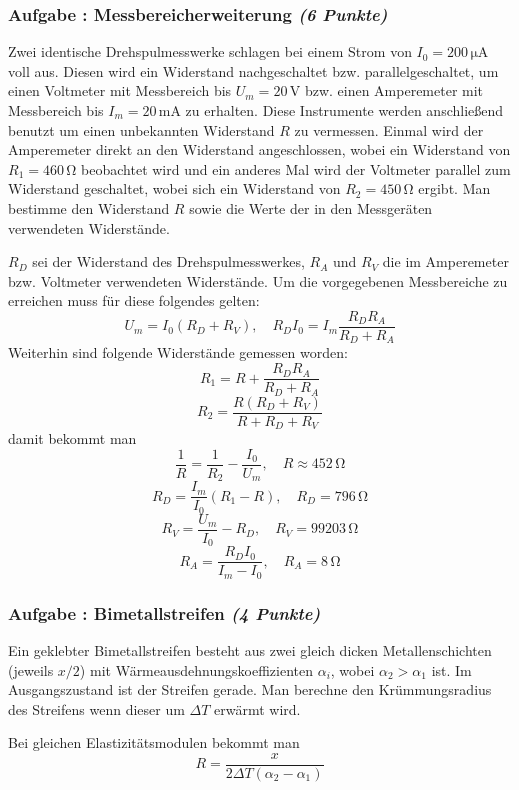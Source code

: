 \documentclass[12pt,a4paper]{article}
\newcommand{\unit}[1]{\,\mathrm{#1}}
\newcounter{numlabel}
\newenvironment{problem}[2]{\stepcounter{numlabel} \vspace{1ex} \subsubsection*{Aufgabe \the\value{numlabel}: #1 \emph{(#2 Punkte)}} \renewcommand{\Currentlabel}{Aufgabe \the\value{numlabel}: #1}}{

}
\begin{document}
\begin{problem}{Messbereicherweiterung}{6}
Zwei identische Drehspulmesswerke schlagen bei einem Strom von $I_0 = 200 \unit{\mu A}$ voll aus. Diesen wird ein Widerstand nachgeschaltet bzw. parallelgeschaltet, um einen Voltmeter mit Messbereich bis $U_m = 20 \unit{V}$ bzw. einen Amperemeter mit Messbereich bis $I_m = 20 \unit{mA}$ zu erhalten. Diese Instrumente werden anschließend benutzt um einen unbekannten Widerstand $R$ zu vermessen. Einmal wird der Amperemeter direkt an den Widerstand angeschlossen, wobei ein Widerstand von $R_1 = 460 \unit{\Omega}$ beobachtet wird und ein anderes Mal wird der Voltmeter parallel zum Widerstand geschaltet, wobei sich ein Widerstand von $R_2 = 450 \unit{\Omega}$ ergibt. Man bestimme den Widerstand $R$ sowie die Werte der in den Messgeräten verwendeten Widerstände.

\begin{solution}
$R_D$ sei der Widerstand des Drehspulmesswerkes, $R_A$ und $R_V$ die im Amperemeter bzw. Voltmeter verwendeten Widerstände. Um die vorgegebenen Messbereiche zu erreichen muss für diese folgendes gelten:
\[
U_m = I_0 (R_D + R_V), \quad R_D I_0 = I_m \frac{R_D R_A}{R_D+R_A}
\]
Weiterhin sind folgende Widerstände gemessen worden:
\[
R_1 = R + \frac{R_D R_A}{R_D+R_A}
\]
\[
R_2 = \frac{R (R_D+R_V)}{R+R_D+R_V}
\]
damit bekommt man
\[
\frac1R = \frac1{R_2} - \frac{I_0}{U_m}, \quad R \approx 452 \unit{\Omega}
\]
\[
R_D = \frac{I_m}{I_0} (R_1 - R), \quad R_D = 796 \unit{\Omega}
\]
\[
R_V = \frac{U_m}{I_0} - R_D, \quad R_V = 99203 \unit{\Omega}
\]
\[
R_A = \frac{R_D I_0}{I_m - I_0}, \quad R_A = 8 \unit{\Omega}
\]

\end{solution}

\end{problem}

\begin{problem}{Bimetallstreifen}{4}
Ein geklebter Bimetallstreifen besteht aus zwei gleich dicken Metallenschichten (jeweils $x/2$) mit Wärmeausdehnungskoeffizienten $\alpha_i$, wobei $\alpha_2 > \alpha_1$ ist. Im Ausgangszustand ist der Streifen gerade. Man berechne den Krümmungsradius des Streifens wenn dieser um $\Delta T$ erwärmt wird.

\begin{solution}
Bei gleichen Elastizitätsmodulen bekommt man
\[
R = \frac{x}{2 \Delta T (\alpha_2-\alpha_1)}
\]
\end{solution}

\end{problem}
\end{document}
